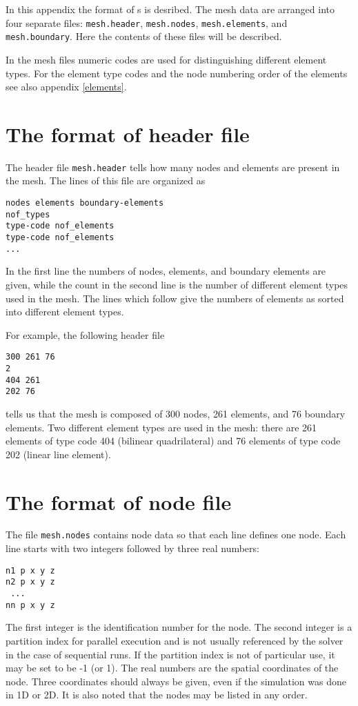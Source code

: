 \label{ch:meshformat}

In this appendix the format of s is desribed.
The mesh data are arranged into four separate files: {\tt mesh.header},
{\tt mesh.nodes}, {\tt mesh.elements}, and {\tt mesh.boundary}.
Here the contents of these files will be described.

In the mesh files numeric codes are used for distinguishing  
different element types. For the element type codes and the node numbering order 
of the elements see also appendix \ref{elements}.


\section{The format of header file}

The header file {\tt mesh.header} tells how many nodes and elements
are present in the mesh. The lines of this file are organized as
\begin{verbatim}
nodes elements boundary-elements
nof_types
type-code nof_elements
type-code nof_elements
...
\end{verbatim}
In the first line the numbers of nodes, elements, and
boundary elements are given, while the count in the second line is
the number of different element types used in the mesh. 
The lines which follow give the numbers of elements 
as sorted into different element types.

For example, the following header file
\begin{verbatim}
300 261 76
2
404 261
202 76
\end{verbatim}
tells us that the mesh is composed of 300 nodes, 261 elements, and 
76 boundary elements. Two different element types are used in the mesh:
there are 261 elements of type code 404 (bilinear quadrilateral) and 
76 elements of type code 202 (linear line element).


\section{The format of node file}

The file {\tt mesh.nodes} contains node data so that each line defines 
one node. Each line starts with two integers followed by three 
real numbers:
\begin{verbatim}
n1 p x y z
n2 p x y z
 ...
nn p x y z
\end{verbatim}
The first integer is the identification number for the node.
The second integer is a partition index for parallel execution and is 
not usually referenced by the solver in the case of sequential runs. If 
the partition index is not of particular use, it may be set to be
-1 (or 1). The real numbers are the spatial coordinates of the
node. Three coordinates should always be given, even if
the simulation was done in 1D or 2D. It 
is also noted that the nodes may be listed in any order.

